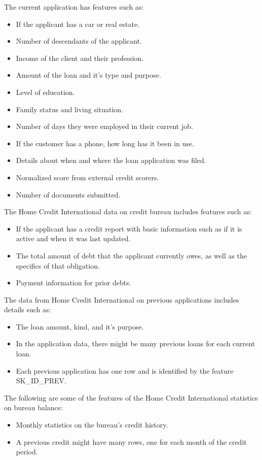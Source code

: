 \documentclass[sigconf, nonacm]{acmart}
\begin{document}
The current application has features such as:
\begin{itemize}
	\item If the applicant has a car or real estate.
	\item Number of descendants of the applicant.
	\item Income of the client and their profession.
	\item Amount of the loan and it's type and purpose.
	\item Level of education.
	\item Family status and living situation.
	\item Number of days they were employed in their current job. 
	\item If the customer has a phone, how long has it been in use.
	\item Details about when and where the loan application was filed.
	\item Normalized score from external credit scorers.
	\item Number of documents submitted.
\end{itemize}

The Home Credit International data on credit bureau includes features such as:
\begin{itemize}
	\item If the applicant has a credit report with basic information such as if it is active and when it was last updated.
	\item The total amount of debt that the applicant currently owes, as well as the specifics of that obligation.
	\item Payment information for prior debts.
\end{itemize}

The data from Home Credit International on previous applications includes details such as:
\begin{itemize}
	\item The loan amount, kind, and it's purpose.
	\item In the application data, there might be many previous loans for each current loan.
	\item Each previous application has one row and is identified by the feature SK\_ID\_PREV.
\end{itemize}

The following are some of the features of the Home Credit International statistics on bureau balance:
\begin{itemize}
	\item Monthly statistics on the bureau's credit history.
	\item A previous credit might have many rows, one for each month of the credit period.
\end{itemize}
\end{document}
